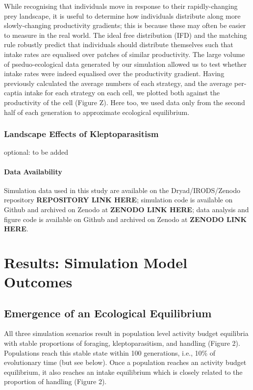 \documentclass[11pt]{article}
\begin{document}
While recognising that individuals move in response to their rapidly-changing prey landscape, it is useful to determine how individuals distribute along more slowly-changing productivity gradients; 
this is because these may often be easier to measure in the real world.
The ideal free distribution (IFD) and the matching rule robustly predict that individuals should distribute themselves such that intake rates are equalised over patches of similar productivity.
The large volume of pseduo-ecological data generated by our simulation allowed us to test whether intake rates were indeed equalised over the productivity gradient.
Having previously calculated the average numbers of each strategy, and the average per-captia intake for each strategy on each cell, we plotted both against the productivity of the cell (Figure Z).
Here too, we used data only from the second half of each generation to approximate ecological equilibrium.

\subsubsection{Landscape Effects of Kleptoparasitism}

optional: to be added

\paragraph*{Data Availability}

Simulation data used in this study are available on the Dryad/IRODS/Zenodo repository \textbf{REPOSITORY LINK HERE}; 
simulation code is available on Github and archived on Zenodo at \textbf{ZENODO LINK HERE}; 
data analysis and figure code is available on Github and archived on Zenodo at \textbf{ZENODO LINK HERE}.

\section{Results: Simulation Model Outcomes}

\subsection{Emergence of an Ecological Equilibrium}

All three simulation scenarios result in population level activity budget equilibria with stable proportions of foraging, kleptoparasitism, and handling (Figure 2).
Populations reach this stable state within 100 generations, i.e., 10\% of evolutionary time (but see below).
Once a population reaches an activity budget equilibrium, it also reaches an intake equilibrium which is closely related to the proportion of handling (Figure 2).
\end{document}
